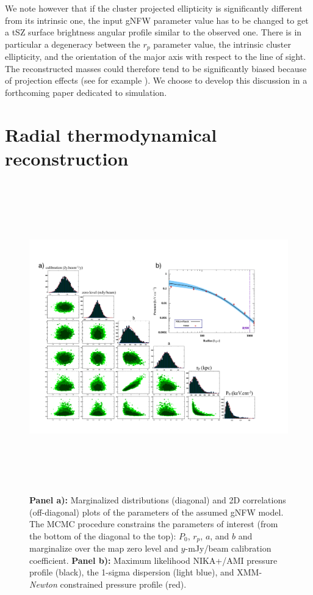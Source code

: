 \documentclass[traditabstract]{aa}
\begin{document}
\indent We note however that if the cluster projected ellipticity is significantly different from its intrinsic one, the input gNFW parameter value has to be changed to get a tSZ surface brightness angular profile similar to the observed one. There is in particular a degeneracy between the $r_p$ parameter value, the intrinsic cluster ellipticity, and the orientation of the major axis with respect to the line of sight. The reconstructed masses could therefore tend to be significantly biased because of projection effects (see for example \citealt{Projection_effect}). We choose to develop this discussion in a forthcoming paper dedicated to simulation.


\section{Radial thermodynamical reconstruction}\label{sec:Radial_pressure_reconstruction}

\begin{figure}[t]
\centering
\includegraphics[height=13.4cm]{MCMC_2D_pressure3.pdf}
\caption{{\footnotesize \textbf{Panel a):} Marginalized distributions (diagonal) and 2D correlations (off-diagonal) plots of the parameters of the assumed gNFW model. The MCMC procedure constrains the parameters of interest (from the bottom of the diagonal to the top): $P_0$, $r_p$, $a$, and $b$ and marginalize over the map zero level and $y$-mJy/beam calibration coefficient. \textbf{Panel b):} Maximum likelihood NIKA+\planck/AMI pressure profile (black),  the 1-sigma dispersion (light
blue), and XMM-{\it Newton} constrained pressure profile (red).}}
\label{fig:MCMC1_likeli2D}
\end{figure}
\end{document}
